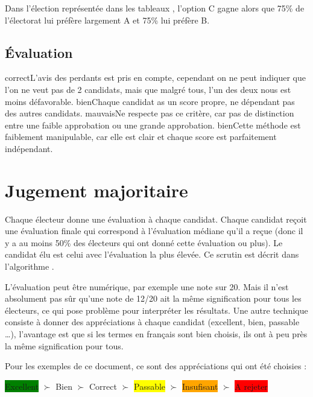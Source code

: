 \documentclass[../report]{subfiles}
\begin{document}
  Dans l'élection représentée dans les tableaux , l'option
  C gagne alors que 75\% de l'électorat lui préfère largement A et 75\% lui préfère B.

  \subsection{Évaluation}
  \tabcritere%
    {correct}{L'avis des perdants est pris en compte, cependant on ne peut indiquer que l'on ne veut pas de 2 candidats, mais que malgré tous, l'un des deux nous est moins défavorable.}%
    {bien}{Chaque candidat as un score propre, ne dépendant pas des autres candidats.}%
    {mauvais}{Ne respecte pas ce critère, car pas de distinction entre une faible approbation ou une grande approbation.}%
    {bien}{Cette méthode est faiblement manipulable, car elle est clair et chaque score est parfaitement indépendant.}

  \section{Jugement majoritaire}

  Chaque électeur donne une évaluation à chaque candidat.
  Chaque candidat reçoit une évaluation finale qui correspond à l'évaluation médiane qu'il a reçue (donc il y a au moins 
  50\% des électeurs qui ont donné cette évaluation ou plus).
  Le candidat élu est celui avec l'évaluation la plus élevée.
  Ce scrutin est décrit dans l'algorithme .

  L'évaluation peut être numérique, par exemple une note sur 20. Mais il n'est absolument pas sûr qu'une note de 12/20 ait
  la même signification pour tous les électeurs, ce qui pose problème pour interpréter les résultats. 
  Une autre technique consiste à donner des appréciations à chaque candidat (excellent, bien, passable …), l'avantage
  est que si les termes en français sont bien choisis, ils ont à peu près la même signification pour tous.

  Pour les exemples de ce document, ce sont des appréciations qui ont été choisies : 

  \begin{center}
  \colorbox{green}{Excellent} $\succ$
  \colorbox{green!50!yellow}{Bien} $\succ$
  \colorbox{green!25!yellow}{Correct} $\succ$
  \colorbox{yellow}{Passable} $\succ$
  \colorbox{orange}{Insufisant} $\succ$
  \colorbox{red}{A rejeter}
  \end{center}
  
\end{document}
